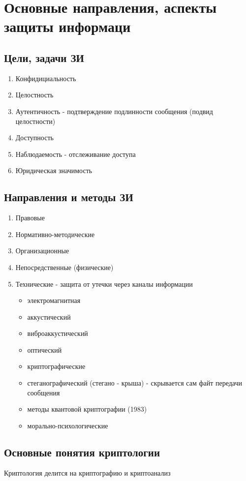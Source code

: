 \section{Основные направления, аспекты защиты информаци}

\subsection{Цели, задачи ЗИ}
\begin{enumerate}
	\item Конфидициальность
	\item Целостность
	\item Аутентичность - подтверждение подлинности сообщения (подвид целостности)
	\item Доступность
	\item Наблюдаемость - отслеживание доступа
	\item Юридическая значимость
\end{enumerate}

\subsection{Направления и методы ЗИ}
\begin{enumerate}
	\item Правовые
	\item Нормативно-методические
	\item Организационные
	\item Непосредственные (физические)
	\item Технические - защита от утечки через каналы информации
	\begin{itemize}
		\item электромагнитная
		\item аккустический
		\item виброаккустический
		\item оптический
		\item криптографические
		\item стеганографический (стегано - крыша) - скрывается сам файт передачи сообщения
		\item методы квантовой криптографии (1983)
		\item морально-психологические
	\end{itemize}
\end{enumerate}

\subsection{Основные понятия криптологии}
Криптология делится на криптографию и криптоанализ

